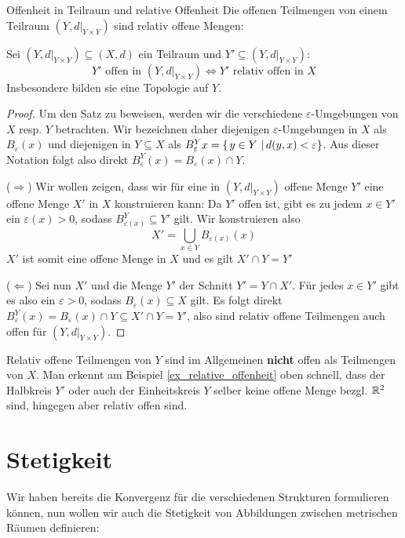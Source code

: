 \begin{satz}{Offenheit in Teilraum und relative Offenheit}{}
Die offenen Teilmengen von einem Teilraum $(Y, d\vert_{Y \times Y})$ sind relativ offene Mengen:

Sei $(Y, d\vert_{Y \times Y}) \subseteq (X, d)$ ein Teilraum und $Y' \subseteq (Y, d\vert_{Y \times Y})$:
$$Y' \text{ offen in } (Y, d\vert_{Y \times Y}) \iff Y' \text{ relativ offen in } X$$
Insbesondere bilden sie eine Topologie auf $Y$.
\end{satz}
\begin{proof}
Um den Satz zu beweisen, werden wir die verschiedene $\varepsilon$-Umgebungen von $X$ resp. $Y$ betrachten. Wir bezeichnen daher diejenigen $\varepsilon$-Umgebungen in $X$ als $B_\varepsilon(x)$ und diejenigen in $Y \subseteq X$ als $B^Y_\varepsilon{x} = \left\{\left.y \in Y \ \right| d(y,x) < \varepsilon \right\}$. Aus dieser Notation folgt also direkt $B^Y_\varepsilon(x) = B_\varepsilon(x) \cap Y$.

($\Longrightarrow$) Wir wollen zeigen, dass wir für eine in $(Y, d\vert_{Y \times Y})$ offene Menge $Y'$ eine offene Menge $X'$ in $X$ konstruieren kann: Da $Y'$ offen ist, gibt es zu jedem $x \in Y'$ ein $\varepsilon(x) > 0$, sodass $B^Y_{\varepsilon(x)} \subseteq Y'$ gilt. Wir konstruieren also
$$X' = \bigcup_{x \in Y} B_{\varepsilon(x)}(x)$$
$X'$ ist somit eine offene Menge in $X$ und es gilt $X' \cap Y = Y'$

($\Longleftarrow$) Sei nun $X'$ und die Menge $Y'$ der Schnitt $Y' = Y \cap X'$. Für jedes $x \in Y'$ gibt es also ein $\varepsilon > 0$, sodass $B_\varepsilon(x) \subseteq X$ gilt. Es folgt direkt $B^Y_\varepsilon(x) = B_\varepsilon(x) \cap Y \subseteq X' \cap Y = Y'$, also sind relativ offene Teilmengen auch offen für $(Y, d\vert_{Y \times Y})$.
\end{proof}

\begin{remark} Relativ offene Teilmengen von $Y$ sind im Allgemeinen \textbf{nicht} offen als Teilmengen von $X$. Man erkennt am Beispiel \ref{ex_relative_offenheit} oben schnell, dass der Halbkreis $Y'$ oder auch der Einheitskreis $Y$ selber keine offene Menge bezgl. $\mathbb{R}^2$ sind, hingegen aber relativ offen sind.
\end{remark}

\section{Stetigkeit}\label{cha_stetigkeit_metr}
Wir haben bereits die Konvergenz für die verschiedenen Strukturen formulieren können, nun wollen wir auch die Stetigkeit von Abbildungen zwischen metrischen Räumen definieren:

